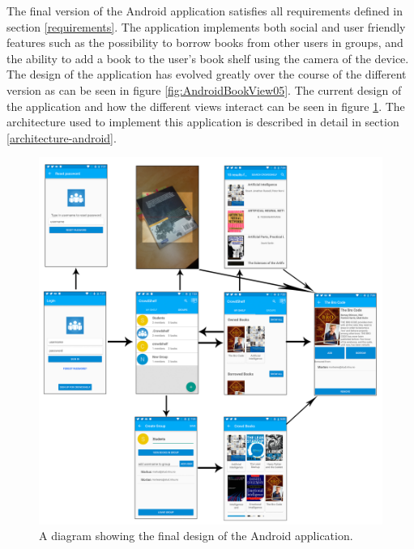 The final version of the Android application satisfies all requirements defined in section \ref{requirements}. The application implements both social and user friendly features such as the possibility to borrow books from other users in groups, and the ability to add a book to the user's book shelf using the camera of the device. The design of the application has evolved greatly over the course of the different version as can be seen in figure \ref{fig:AndroidBookView05}. The current design of the application and how the different views interact can be seen in figure \ref{fig:AndroidFinalDesign}. The architecture used to implement this application is described in detail in section \ref{architecture-android}.



\begin{figure}
    \begin{center}
        \includegraphics[width=.5\textwidth,keepaspectratio]{figs/AndroidFinalDesign.png}
        \caption{A diagram showing the final design of the Android application.}
        \label{fig:AndroidFinalDesign}
    \end{center}
\end{figure}




